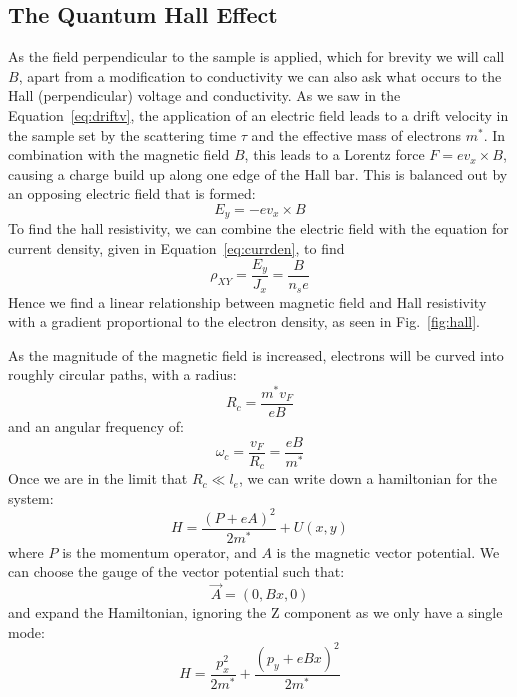 \subsection{The Quantum Hall Effect}
As the field perpendicular to the sample is applied, which for brevity we will call $B$, apart from a modification to conductivity
we can also ask what occurs to the Hall (perpendicular) voltage and conductivity. As we saw in the Equation~\ref{eq:driftv},
the application of an electric field leads to a drift velocity in the sample set by the scattering
time $\tau$ and the effective mass of electrons $m^*$. In combination with the magnetic field $B$, this leads to a Lorentz force $F = e v_x \times B$, causing
a charge build up along one edge of the Hall bar. This is balanced out by an opposing electric field that is formed:
\begin{equation}
  E_y = -e v_x \times B
\end{equation}
To find the hall resistivity, we can combine the electric field with the equation for current density, given in Equation~\ref{eq:currden}, to find
\begin{equation}
  \rho_{XY} = \frac{E_y}{J_x} = \frac{B}{n_s e}
\end{equation}
Hence we find a linear relationship between magnetic field and Hall resistivity with a gradient proportional to the electron density, as seen in Fig.~\ref{fig:hall}.

As the magnitude of the magnetic field is increased, electrons will be curved into roughly circular paths, with a radius:
\begin{equation}
  R_c = \frac{m^* v_F}{e B}
\end{equation}
and an angular frequency of:
\begin{equation}
  \omega_c = \frac{v_F}{R_c} = \frac{e B}{m^*}
  \label{eq:cycl}
\end{equation}
Once we are in the limit that $R_c \ll l_e$, we can write down a hamiltonian for the system:
\begin{equation}
  H = \frac{(P + eA)^2}{2m^*} + U(x, y)
\end{equation}
where $P$ is the momentum operator, and $A$ is the magnetic vector potential. We can choose the gauge of the vector potential such
that:
\begin{equation}
  \vec{A} = (0, Bx, 0)
\end{equation}
and expand the Hamiltonian, ignoring the Z component as we only have a single mode:
\begin{equation}
  H = \frac{p_x^2}{2m^*} + \frac{(p_y + eBx)^2}{2m^*}
\end{equation}

